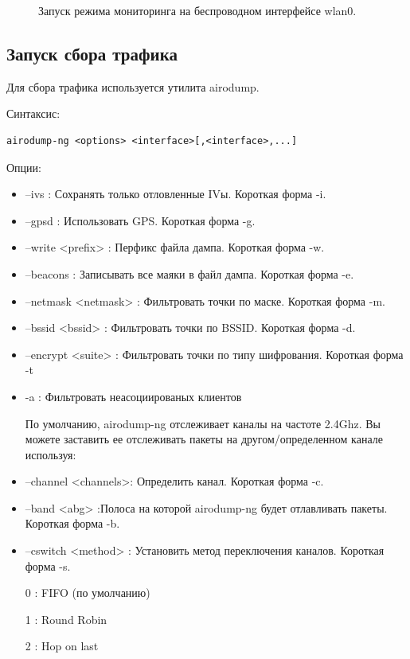 \documentclass[10pt,a4paper]{report}
\begin{document}
\begin{figure}[h]	
	\caption{Запуск режима мониторинга на беспроводном интерфейсе wlan0.}
	\label{Img:1}
\end{figure}
\pagebreak

\subsection{Запуск сбора трафика}

Для сбора трафика используется утилита airodump. 

Синтаксис:
\begin{verbatim}
airodump-ng <options> <interface>[,<interface>,...]
\end{verbatim}

Опции:
\begin{itemize}
	\item --ivs : Сохранять только отловленные IVы. Короткая форма -i.
	\item --gpsd : Использовать GPS. Короткая форма -g.
	\item --write <prefix> : Перфикс файла дампа. Короткая форма -w.
	\item --beacons : Записывать все маяки в файл дампа. Короткая форма -e.
	\item --netmask <netmask> : Фильтровать точки по маске. Короткая форма -m.
	\item --bssid <bssid> : Фильтровать точки по BSSID. Короткая форма -d.
	\item --encrypt <suite> : Фильтровать точки по типу шифрования. Короткая форма -t
	\item -a : Фильтровать неасоциированых клиентов
	
	По умолчанию, airodump-ng отслеживает каналы на частоте 2.4Ghz.
	Вы можете заставить ее отслеживать пакеты на другом/определенном канале используя:
	\item --channel <channels>: Определить канал. Короткая форма -c.
	\item --band <abg> :Полоса на которой airodump-ng будет отлавливать
	пакеты. Короткая форма -b.
	\item --cswitch <method> : Установить метод переключения каналов. Короткая форма -s.
	
	0 : FIFO (по умолчанию)
	
	1 : Round Robin
	
	2 : Hop on last
\end{itemize}
\end{document}
